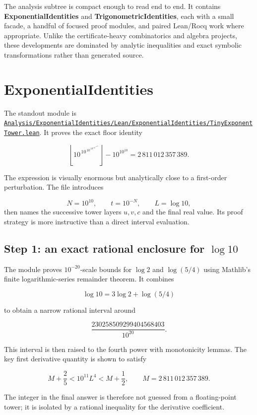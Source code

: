 \documentclass[
  10pt,
  a4paper,
  twoside,
  open=any,
  parskip=half,
  headings=big
]{scrreprt}
\newcommand{\CommitFull}{675d0a2ff0fc624fba199e006049016ba806f40a}
\newcommand{\RepoBlobBase}{https://github.com/VladimirReshetnikov/ProveIt/blob/\CommitFull/}
\newcommand{\RepoFile}[1]{%
  \href{\RepoBlobBase\detokenize{#1}}{\nolinkurl{#1}}}
\newcommand{\project}[1]{\textsf{\bfseries #1}}
\begin{document}
The analysis subtree is compact enough to read end to end.  It contains
\project{ExponentialIdentities} and \project{TrigonometricIdentities}, each
with a small facade, a handful of focused proof modules, and paired Lean/Rocq
work where appropriate.  Unlike the certificate-heavy combinatorics and
algebra projects, these developments are dominated by analytic inequalities
and exact symbolic transformations rather than generated source.

\section{ExponentialIdentities}

The standout module is
\RepoFile{Analysis/ExponentialIdentities/Lean/ExponentialIdentities/TinyExponentTower.lean}.
It proves the exact floor identity

\[
\left\lfloor
10^{\,10^{\,10^{\,10^{\,10^{-10^{10}}}}}}
\right\rfloor
-10^{10^{10}}
= 2\,811\,012\,357\,389.
\]

The expression is visually enormous but analytically close to a first-order
perturbation.  The file introduces

\[
N=10^{10},\qquad
t=10^{-N},\qquad
L=\log 10,
\]
then names the successive tower layers \(u,v,c\) and the final real value.
Its proof strategy is more instructive than a direct interval evaluation.

\subsection[Step 1: an exact rational enclosure for log 10]{Step 1: an exact rational enclosure for \(\log 10\)}

The module proves \(10^{-20}\)-scale bounds for \(\log 2\) and
\(\log(5/4)\) using Mathlib's finite logarithmic-series remainder theorem.
It combines

\[
\log 10 = 3\log 2+\log(5/4)
\]

to obtain a narrow rational interval around

\[
\frac{230258509299404568403}{10^{20}}.
\]

This interval is then raised to the fourth power with monotonicity lemmas.
The key first derivative quantity is shown to satisfy

\[
M+\frac{2}{5}
< 10^{11}L^4
< M+\frac{1}{2},
\qquad
M=2\,811\,012\,357\,389.
\]

The integer in the final answer is therefore not guessed from a floating-point
tower; it is isolated by a rational inequality for the derivative coefficient.
\end{document}
